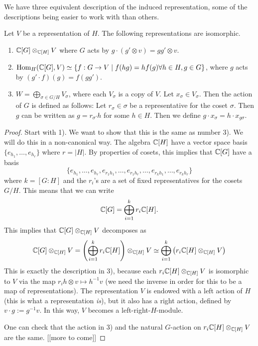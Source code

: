 \documentclass[11pt, english]{article}
\begin{document}
We have three equivalent description of the induced representation, some of the descriptions being easier to work with than others.

\begin{thm}
Let $V$ be a representation of $H$. The following representations are isomorphic.
\begin{enumerate}
\item $\mathbb{C}[G] \otimes_{\mathbb{C}[H]} V$ where $G$ acts by $g \cdot (g' \otimes v) = gg' \otimes v$. 
\item $\operatorname{Hom}_H(\mathbb{C}[G],V) \simeq \{ f:G \to V \mid f(hg)=hf(g) \forall h \in H, g \in G \}$, where $g$ acts by $(g' \cdot f)(g) = f(gg')$.
\item $W = \bigoplus_{\sigma \in G/H} V_\sigma$, where each $V_\sigma$ is a copy of $V$. Let $x_\sigma \in V_\sigma$. Then the action of $G$ is defined as follows: Let $r_\sigma \in \sigma$ be a representative for the coset $\sigma$. Then $g$ can be written as $g=r_{\sigma'}h$ for some $h \in H$. Then we define $g \cdot  x_\sigma = h \cdot x_{g \sigma}$.
\end{enumerate}
\end{thm}

\begin{proof}
Start with 1). We want to show that this is the same as number 3). We will do this in a non-canonical way. The algebra $\mathbb{C}[H]$ have a vector space basis $\{e_{h_1}, \ldots, e_{h_r}\}$ where $r=\lvert H \rvert$. By properties of cosets, this implies that $\mathbb{C}[G]$ have a basis 
$$\{e_{h_1},\ldots, e_{h_r},e_{r_1h_1},\ldots, e_{r_1h_r},\ldots,e_{r_kh_1},\ldots,e_{r_kh_r} \}$$
where $k=[G:H]$ and the $r_i$'s are a set of fixed representatives for the cosets $G/H$. This means that we can write
$$
\mathbb{C}[G] = \bigoplus_{i=1}^k r_i \mathbb{C}[H].
$$
This implies that $\mathbb{C}[G] \otimes_{\mathbb{C}[H]} V$ decomposes as
$$
\mathbb{C}[G] \otimes_{\mathbb{C}[H]} V = \left(\bigoplus_{i=1}^k r_i \mathbb{C}[H]\right) \otimes_{\mathbb{C}[H]} V \simeq \bigoplus_{i=1}^k \left( r_i \mathbb{C}[H] \otimes_{\mathbb{C}[H]} V \right)
$$
This is exactly the description in 3), because each $r_i \mathbb{C}[H] \otimes_{\mathbb{C}[H]} V$ is isomorphic to $V$ via the map $r_ih \otimes v \mapsto h^{-1}v$ (we need the inverse in order for this to be a map of representations). The representation $V$ is endowed with a left action of $H$ (this is what a representation \emph{is}), but it also has a right action, defined by $v \cdot g := g^{-1}v$. In this way, $V$ becomes a left-right-$H$-module.

One can check that the action in 3) and the natural $G$-action on $r_i\mathbb{C}[H] \otimes_{\mathbb{C}[H]} V$ are the same.
[[more to come]]
\end{proof}
\end{document}
